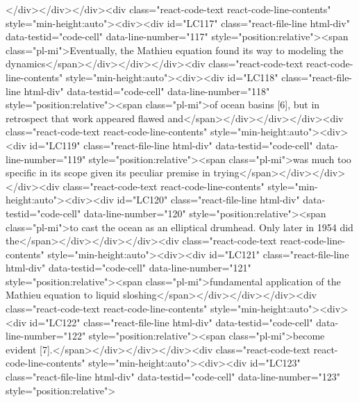 {</div></div></div><div class="react-code-text react-code-line-contents" style="min-height:auto"><div><div id="LC117" class="react-file-line html-div" data-testid="code-cell" data-line-number="117" style="position:relative"><span class="pl-mi">Eventually, the Mathieu equation found its way to modeling the dynamics</span></div></div></div><div class="react-code-text react-code-line-contents" style="min-height:auto"><div><div id="LC118" class="react-file-line html-div" data-testid="code-cell" data-line-number="118" style="position:relative"><span class="pl-mi">of ocean basins {[}6{]}, but in retrospect that work appeared flawed and</span></div></div></div><div class="react-code-text react-code-line-contents" style="min-height:auto"><div><div id="LC119" class="react-file-line html-div" data-testid="code-cell" data-line-number="119" style="position:relative"><span class="pl-mi">was much too specific in its scope given its peculiar premise in trying</span></div></div></div><div class="react-code-text react-code-line-contents" style="min-height:auto"><div><div id="LC120" class="react-file-line html-div" data-testid="code-cell" data-line-number="120" style="position:relative"><span class="pl-mi">to cast the ocean as an elliptical drumhead. Only later in 1954 did the</span></div></div></div><div class="react-code-text react-code-line-contents" style="min-height:auto"><div><div id="LC121" class="react-file-line html-div" data-testid="code-cell" data-line-number="121" style="position:relative"><span class="pl-mi">fundamental application of the Mathieu equation to liquid sloshing</span></div></div></div><div class="react-code-text react-code-line-contents" style="min-height:auto"><div><div id="LC122" class="react-file-line html-div" data-testid="code-cell" data-line-number="122" style="position:relative"><span class="pl-mi">become evident {[}7{]}.</span></div></div></div><div class="react-code-text react-code-line-contents" style="min-height:auto"><div><div id="LC123" class="react-file-line html-div" data-testid="code-cell" data-line-number="123" style="position:relative">
}

